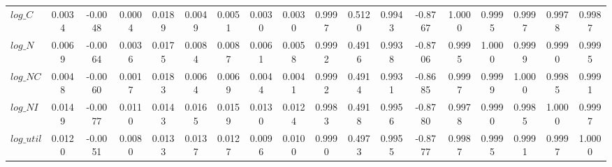 \begin{center}
\begin{longtable}{lccccccccccccccccc}
$log\_C     $	 & 	       0.0034	 & 	      -0.0048	 & 	       0.0004	 & 	       0.0189	 & 	       0.0049	 & 	       0.0051	 & 	       0.0030	 & 	       0.0030	 & 	       0.9997	 & 	       0.5120	 & 	       0.9943	 & 	      -0.8767	 & 	       1.0000	 & 	       0.9995	 & 	       0.9997	 & 	       0.9978	 & 	       0.9987 \\ 
$log\_N     $	 & 	       0.0069	 & 	      -0.0064	 & 	       0.0036	 & 	       0.0175	 & 	       0.0084	 & 	       0.0087	 & 	       0.0061	 & 	       0.0058	 & 	       0.9992	 & 	       0.4916	 & 	       0.9938	 & 	      -0.8706	 & 	       0.9995	 & 	       1.0000	 & 	       0.9999	 & 	       0.9990	 & 	       0.9995 \\ 
$log\_NC    $	 & 	       0.0048	 & 	      -0.0060	 & 	       0.0017	 & 	       0.0183	 & 	       0.0064	 & 	       0.0069	 & 	       0.0044	 & 	       0.0041	 & 	       0.9992	 & 	       0.4914	 & 	       0.9931	 & 	      -0.8685	 & 	       0.9997	 & 	       0.9999	 & 	       1.0000	 & 	       0.9985	 & 	       0.9991 \\ 
$log\_NI    $	 & 	       0.0149	 & 	      -0.0077	 & 	       0.0110	 & 	       0.0143	 & 	       0.0165	 & 	       0.0159	 & 	       0.0130	 & 	       0.0124	 & 	       0.9983	 & 	       0.4918	 & 	       0.9956	 & 	      -0.8780	 & 	       0.9978	 & 	       0.9990	 & 	       0.9985	 & 	       1.0000	 & 	       0.9997 \\ 
$log\_util  $	 & 	       0.0120	 & 	      -0.0051	 & 	       0.0080	 & 	       0.0133	 & 	       0.0137	 & 	       0.0127	 & 	       0.0096	 & 	       0.0100	 & 	       0.9990	 & 	       0.4973	 & 	       0.9955	 & 	      -0.8777	 & 	       0.9987	 & 	       0.9995	 & 	       0.9991	 & 	       0.9997	 & 	       1.0000 \\ 
\end{longtable}
 \end{center}
